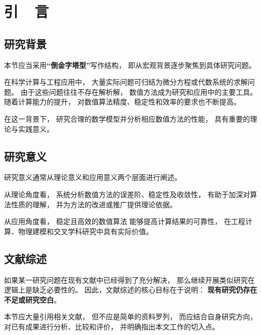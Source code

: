 \documentclass[UTF8, a4paper, zihao=-4]{ctexart} %
\numberwithin{equation}{section}%
\begin{document}
\newpage

\tableofcontents
\newpage

\listoffigures
\newpage

\listoftables
\newpage

\cleardoublepage
{}

\section{引\ \ 言}
\renewcommand{\thepage}{\arabic{page}}
\setcounter{page}{1}

\subsection{研究背景}

本节应当采用\textbf{“倒金字塔型”}写作结构，
即从宏观背景逐步聚焦到具体研究问题。

在科学计算与工程应用中，
大量实际问题可归结为微分方程或代数系统的求解问题。
由于这些问题往往不存在解析解，
数值方法成为研究和应用中的主要工具。
随着计算能力的提升，
对数值算法精度、稳定性和效率的要求也不断提高。

在这一背景下，
研究合理的数学模型并分析相应数值方法的性能，
具有重要的理论与实践意义。

\subsection{研究意义}

研究意义通常从理论意义和应用意义两个层面进行阐述。

从理论角度看，
系统分析数值方法的误差阶、稳定性及收敛性，
有助于加深对算法性质的理解，
并为方法的改进或推广提供理论依据。

从应用角度看，
稳定且高效的数值算法
能够提高计算结果的可靠性，
在工程计算、物理建模和交叉学科研究中具有实际价值。

\subsection{文献综述}

如果某一研究问题在现有文献中已经得到了充分解决，
那么继续开展类似研究在逻辑上是缺乏必要性的。
因此，文献综述的核心目标在于说明：
\textbf{现有研究仍存在不足或研究空白}。

本节应大量引用相关文献，
但不应是简单的资料罗列，
而应结合自身研究方向，
对已有成果进行分析、比较和评价，
并明确指出本文工作的切入点。
\end{document}
